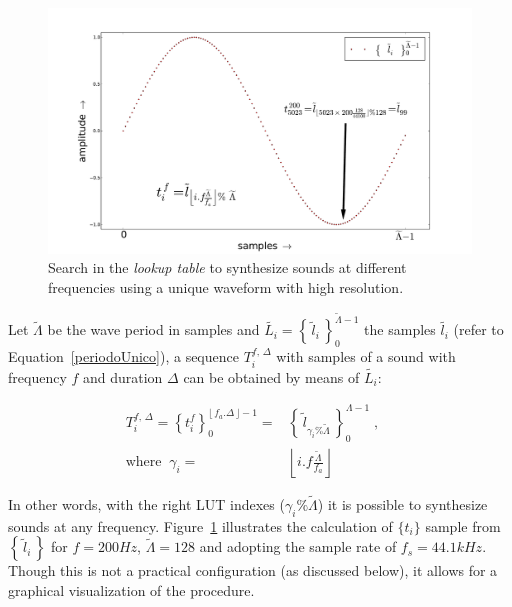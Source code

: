 \begin{figure}
    \centering
        \includegraphics[width=\textwidth]{figures/lut}
    \caption{Search in the \emph{lookup table} to synthesize sounds at different frequencies using a unique waveform with high resolution.}
        \label{fig:lut}                                                                                                            
\end{figure}

Let $\widetilde{\Lambda}$ be the wave period in samples and $\widetilde{L_i} = \left\{\, \widetilde{l}_i \,\right\}_0^{\widetilde{\Lambda} -1}$ the samples $\widetilde{l_i}$ (refer to Equation~\ref{periodoUnico}), a sequence $T_i^{f,\,\Delta}$ with samples of a sound with frequency $f$ and duration $\Delta$ can be obtained by means of $\widetilde{L_i}$:

\begin{equation}\label{eq:lut}
\begin{split}
T_i^{f,\,\Delta}=\left\{t_i^f\right\}_0^{\lfloor \, f_a . \Delta \, \rfloor -1} = & \left\{ \, \widetilde{l}_{\gamma_i \% \widetilde{\Lambda} }\, \right\}_{0}^{\Lambda-1}\; , \quad \\ \text{where} \;\; \gamma_i = & \left \lfloor i . f \frac{ \widetilde{\Lambda}}{f_a} \right \rfloor  
\end{split}
\end{equation}

In other words, with the right LUT indexes ($\gamma_i\%\widetilde{\Lambda}$) it is possible to synthesize sounds at any frequency. Figure~\ref{fig:lut} illustrates the calculation of $\{t_i\}$ sample from $\left\{\,\widetilde{l}_i\,\right\}$ for $f=200Hz$, $\widetilde{\Lambda}=128$ and adopting the sample rate of $f_s=44.1kHz$. Though this is not a practical configuration (as discussed below), it allows for a graphical visualization of the procedure.

